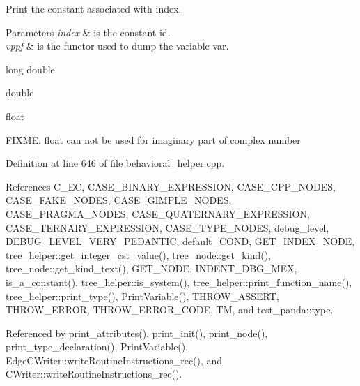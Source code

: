 Print the constant associated with index. 


\begin{DoxyParams}{Parameters}
{\em index} & is the constant id. \\
\hline
{\em vppf} & is the functor used to dump the variable var. \\
\hline
\end{DoxyParams}
long double

double

float

F\+I\+X\+ME\+: float can not be used for imaginary part of complex number 

Definition at line 646 of file behavioral\+\_\+helper.\+cpp.



References C\+\_\+\+EC, C\+A\+S\+E\+\_\+\+B\+I\+N\+A\+R\+Y\+\_\+\+E\+X\+P\+R\+E\+S\+S\+I\+ON, C\+A\+S\+E\+\_\+\+C\+P\+P\+\_\+\+N\+O\+D\+ES, C\+A\+S\+E\+\_\+\+F\+A\+K\+E\+\_\+\+N\+O\+D\+ES, C\+A\+S\+E\+\_\+\+G\+I\+M\+P\+L\+E\+\_\+\+N\+O\+D\+ES, C\+A\+S\+E\+\_\+\+P\+R\+A\+G\+M\+A\+\_\+\+N\+O\+D\+ES, C\+A\+S\+E\+\_\+\+Q\+U\+A\+T\+E\+R\+N\+A\+R\+Y\+\_\+\+E\+X\+P\+R\+E\+S\+S\+I\+ON, C\+A\+S\+E\+\_\+\+T\+E\+R\+N\+A\+R\+Y\+\_\+\+E\+X\+P\+R\+E\+S\+S\+I\+ON, C\+A\+S\+E\+\_\+\+T\+Y\+P\+E\+\_\+\+N\+O\+D\+ES, debug\+\_\+level, D\+E\+B\+U\+G\+\_\+\+L\+E\+V\+E\+L\+\_\+\+V\+E\+R\+Y\+\_\+\+P\+E\+D\+A\+N\+T\+IC, default\+\_\+\+C\+O\+ND, G\+E\+T\+\_\+\+I\+N\+D\+E\+X\+\_\+\+N\+O\+DE, tree\+\_\+helper\+::get\+\_\+integer\+\_\+cst\+\_\+value(), tree\+\_\+node\+::get\+\_\+kind(), tree\+\_\+node\+::get\+\_\+kind\+\_\+text(), G\+E\+T\+\_\+\+N\+O\+DE, I\+N\+D\+E\+N\+T\+\_\+\+D\+B\+G\+\_\+\+M\+EX, is\+\_\+a\+\_\+constant(), tree\+\_\+helper\+::is\+\_\+system(), tree\+\_\+helper\+::print\+\_\+function\+\_\+name(), tree\+\_\+helper\+::print\+\_\+type(), Print\+Variable(), T\+H\+R\+O\+W\+\_\+\+A\+S\+S\+E\+RT, T\+H\+R\+O\+W\+\_\+\+E\+R\+R\+OR, T\+H\+R\+O\+W\+\_\+\+E\+R\+R\+O\+R\+\_\+\+C\+O\+DE, TM, and test\+\_\+panda\+::type.



Referenced by print\+\_\+attributes(), print\+\_\+init(), print\+\_\+node(), print\+\_\+type\+\_\+declaration(), Print\+Variable(), Edge\+C\+Writer\+::write\+Routine\+Instructions\+\_\+rec(), and C\+Writer\+::write\+Routine\+Instructions\+\_\+rec().

